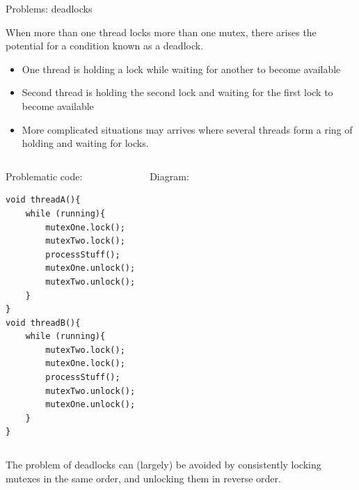 \documentclass[8pt]{beamer}
\begin{document}
\begin{frame}[fragile]{Problems: deadlocks}
 
When more than one thread locks more than one mutex, there arises the potential for a condition known as a deadlock. 
\begin{itemize}
  \item One thread is holding a lock while waiting for another to become available
  \item Second thread is holding the second lock and waiting for the first lock to become available
  \item More complicated situations may arrives where several threads form a ring of holding and waiting for locks.
\end{itemize}

\begin{columns}

\begin{exampleblock}{Problematic code:}
 
\begin{lstlisting} 
void threadA(){
    while (running){
        mutexOne.lock();
        mutexTwo.lock();
        processStuff();
        mutexOne.unlock();
        mutexTwo.unlock();
    }
}
void threadB(){
    while (running){
        mutexTwo.lock();
        mutexOne.lock();
        processStuff();
        mutexTwo.unlock();
        mutexOne.unlock();
    }
}
\end{lstlisting}

\end{exampleblock}

\begin{block}{Diagram:}
\centering 
 

\end{block}

\end{columns}

The problem of deadlocks can (largely) be avoided by consistently locking mutexes in the same order, and unlocking them in reverse order.

\end{frame}
\end{document}

